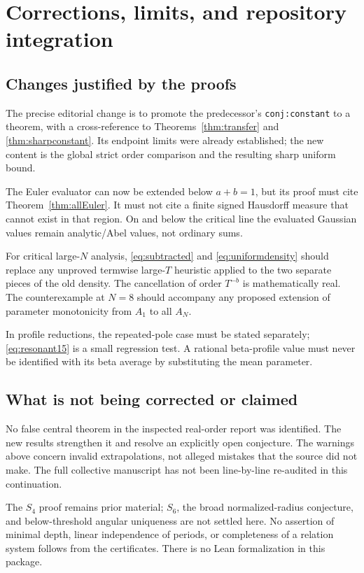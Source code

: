 \documentclass[11pt]{article}
\numberwithin{equation}{section}
\theoremstyle{definition}\newtheorem{definition}[theorem]{Definition}
\theoremstyle{remark}\newtheorem{remark}[theorem]{Remark}
\begin{document}
\section{Corrections, limits, and repository integration}
\label{sec:audit}

\subsection{Changes justified by the proofs}
The precise editorial change is to promote the predecessor's
\texttt{conj:constant} to a theorem, with a cross-reference to
Theorems~\ref{thm:transfer} and \ref{thm:sharpconstant}. Its endpoint
limits were already established; the new content is the global strict
order comparison and the resulting sharp uniform bound.

The Euler evaluator can now be extended below $a+b=1$, but its proof
must cite Theorem~\ref{thm:allEuler}. It must not cite a finite signed
Hausdorff measure that cannot exist in that region. On and below the
critical line the evaluated Gaussian values remain analytic/Abel
values, not ordinary sums.

For critical large-$N$ analysis, \eqref{eq:subtracted} and
\eqref{eq:uniformdensity} should replace any unproved termwise
large-$T$ heuristic applied to the two separate pieces of the old
density. The cancellation of order $T^{-b}$ is mathematically real.
The counterexample at $N=8$ should accompany any proposed extension
of parameter monotonicity from $A_1$ to all $A_N$.

In profile reductions, the repeated-pole case must be stated
separately; \eqref{eq:resonant15} is a small regression test. A
rational beta-profile value must never be identified with its beta
average by substituting the mean parameter.

\subsection{What is not being corrected or claimed}
No false central theorem in the inspected real-order report was
identified. The new results strengthen it and resolve an explicitly
open conjecture. The warnings above concern invalid extrapolations,
not alleged mistakes that the source did not make. The full collective
manuscript has not been line-by-line re-audited in this continuation.

The $S_4$ proof remains prior material; $S_6$, the broad normalized-radius
conjecture, and below-threshold angular uniqueness are not settled
here. No assertion of minimal depth, linear independence of periods,
or completeness of a relation system follows from the certificates.
There is no Lean formalization in this package.
\end{document}
